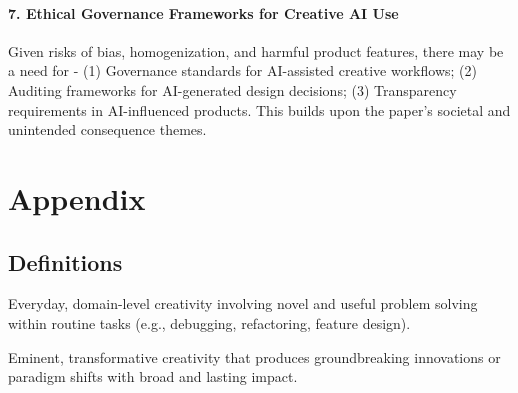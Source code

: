 \paragraph{7. Ethical Governance Frameworks for Creative AI Use}
Given risks of bias, homogenization, and harmful product features, there may be a need for - (1) Governance standards for AI-assisted creative workflows; (2) Auditing frameworks for AI-generated design decisions; (3) Transparency requirements in AI-influenced products. This builds upon the paper’s societal and unintended consequence themes.

\section{Appendix}
\subsection*{Definitions}
\begin{definition}
    \label{def:little_c_creativity}
    Everyday, domain-level creativity involving novel and useful problem solving within routine tasks (e.g., debugging, refactoring, feature design).
\end{definition}

\begin{definition}
    \label{def:big_c_creativity}
    Eminent, transformative creativity that produces groundbreaking innovations or paradigm shifts with broad and lasting impact.
\end{definition}